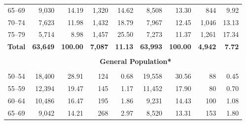 \begin{landscape}
\begin{table}[H]
\begin{tabular}{ccccccccc}
    65--69 & \multicolumn{1}{r}{9,030} & \multicolumn{1}{r}{14.19} & \multicolumn{1}{r}{1,320} & \multicolumn{1}{r}{14.62} & \multicolumn{1}{r}{8,508} & \multicolumn{1}{r}{13.30} & \multicolumn{1}{r}{844} & \multicolumn{1}{r}{9.92} \\
    70--74 & \multicolumn{1}{r}{7,623} & \multicolumn{1}{r}{11.98} & \multicolumn{1}{r}{1,432} & \multicolumn{1}{r}{18.79} & \multicolumn{1}{r}{7,967} & \multicolumn{1}{r}{12.45} & \multicolumn{1}{r}{1,046} & \multicolumn{1}{r}{13.13} \\
    75--79 & \multicolumn{1}{r}{5,714} & \multicolumn{1}{r}{8.98} & \multicolumn{1}{r}{1,457} & \multicolumn{1}{r}{25.50} & \multicolumn{1}{r}{7,273} & \multicolumn{1}{r}{11.37} & \multicolumn{1}{r}{1,261} & \multicolumn{1}{r}{17.34} \\
    \textbf{Total} & \multicolumn{1}{r}{\textbf{63,649}} & \multicolumn{1}{r}{\textbf{100.00}} & \multicolumn{1}{r}{\textbf{7,087}} & \multicolumn{1}{r}{\textbf{11.13}} & \multicolumn{1}{r}{\textbf{63,993}} & \multicolumn{1}{r}{\textbf{100.00}} & \multicolumn{1}{r}{\textbf{4,942}} & \multicolumn{1}{r}{\textbf{7.72}} \\
          &       &       &       &       &       &       &       &  \\
          & \multicolumn{8}{c}{\textbf{General Population*}} \\
          &       &       &       &       &       &       &       &  \\
    50--54 & \multicolumn{1}{r}{18,400} & \multicolumn{1}{r}{28.91} & \multicolumn{1}{r}{124} & \multicolumn{1}{r}{0.68} & \multicolumn{1}{r}{19,558} & \multicolumn{1}{r}{30.56} & \multicolumn{1}{r}{88} & \multicolumn{1}{r}{0.45} \\
    55--59 & \multicolumn{1}{r}{12,394} & \multicolumn{1}{r}{19.47} & \multicolumn{1}{r}{145} & \multicolumn{1}{r}{1.17} & \multicolumn{1}{r}{11,452} & \multicolumn{1}{r}{17.90} & \multicolumn{1}{r}{80} & \multicolumn{1}{r}{0.70} \\
    60--64 & \multicolumn{1}{r}{10,486} & \multicolumn{1}{r}{16.47} & \multicolumn{1}{r}{195} & \multicolumn{1}{r}{1.86} & \multicolumn{1}{r}{9,231} & \multicolumn{1}{r}{14.43} & \multicolumn{1}{r}{100} & \multicolumn{1}{r}{1.08} \\
    65--69 & \multicolumn{1}{r}{9,042} & \multicolumn{1}{r}{14.21} & \multicolumn{1}{r}{268} & \multicolumn{1}{r}{2.97} & \multicolumn{1}{r}{8,520} & \multicolumn{1}{r}{13.31} & \multicolumn{1}{r}{153} & \multicolumn{1}{r}{1.80} \\

\end{tabular}
\end{table}
\end{landscape}
